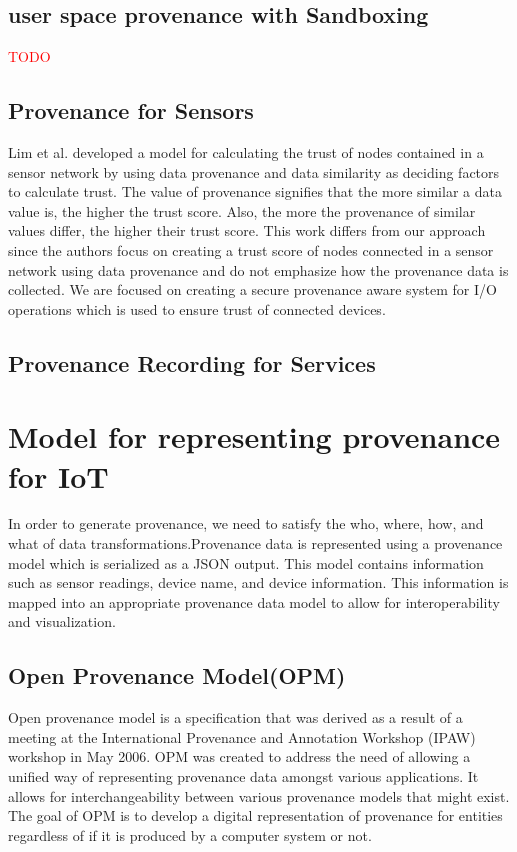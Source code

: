 \subsection{user space provenance with Sandboxing}
\textcolor{red}{TODO}


\subsection{Provenance for Sensors}
Lim et al. developed a
model for calculating the trust of nodes contained in a sensor network by using data
provenance and data similarity as deciding factors to calculate trust. The value of
provenance signifies that the more similar a data value is, the higher the trust score.
Also, the more the provenance of similar values differ, the higher their trust score.
This work differs from our approach since the authors focus on creating a trust score
of nodes connected in a sensor network using data provenance and do not emphasize
how the provenance data is collected. We are focused on creating a secure
provenance aware system for I/O operations which is used to ensure trust of
connected devices.

\subsection{Provenance Recording for Services}






\section{Model for representing provenance for IoT}

In order to generate provenance, we need to satisfy the who, where, how, and what of data transformations.Provenance data is represented using a provenance model which is serialized as a JSON output. This model contains information such as sensor readings, device name, and device information. This information is mapped into an appropriate provenance data model  to allow for interoperability and visualization.

\subsection{Open Provenance Model(OPM)}

Open provenance model is a specification that was derived as a result of a meeting at the International Provenance and Annotation Workshop (IPAW) workshop in May 2006. OPM was created to address the need of allowing a unified way of representing provenance data amongst various applications. It allows for interchangeability between various provenance models that might exist. The goal of OPM is to develop a digital representation of provenance for entities regardless of if it is produced by a computer system or not. 

